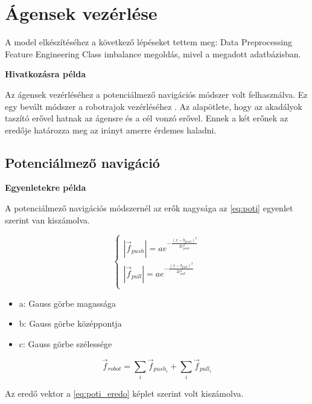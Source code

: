 \section{Ágensek vezérlése}
A model elkészítéséhez a következő lépéseket tettem meg:
Data Preprocessing
Feature Engineering
Class imbalance megoldás, mivel a megadott adatbázisban.


\textbf{Hivatkozásra példa}

Az ágensek vezérléséhez a potenciálmező navigációs módszer volt felhasználva. Ez egy bevált módszer a robotrajok vezérléséhez \cite{szanto2015investigation}. Az alapötlete, hogy az akadályok taszító erővel hatnak az ágensre és a cél vonzó erővel. Ennek a két erőnek az eredője határozza meg az irányt amerre érdemes haladni.

\subsection{Potenciálmező navigáció}

\textbf{Egyenletekre példa}

A potenciálmező navigációs módszernél az erők nagysága az \eqref{eq:poti} egyenlet szerint van kiszámolva.

\begin{equation}
    \left\{
    \begin{array}{l}
        |\vec{f}_{push}| = a e ^ {- \frac{(x - b_{push}) ^ {2}}{2 c_{push}^2 }} \\
        |\vec{f}_{pull}| = a e ^ {- \frac{(x - b_{pull}) ^ {2}}{2 c_{pull}^2 }} \\
    \end{array}
    \right.
    \label{eq:poti}
\end{equation}

\begin{itemize}
    \item a: Gauss görbe magassága
    \item b: Gauss görbe középpontja
    \item c: Gauss görbe szélessége
\end{itemize}

\begin{equation}
    \vec{f}_{robot} = \sum_{i} \vec{f}_{push_{i}} + \sum_{i} \vec{f}_{pull_{i}}
    \label{eq:poti_eredo}
\end{equation}

Az eredő vektor a \eqref{eq:poti_eredo} képlet szerint volt kiszámolva. 
